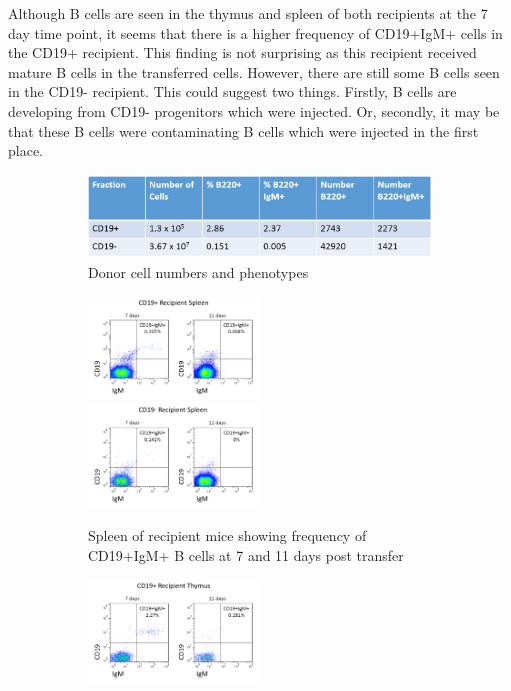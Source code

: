 Although B cells are seen in the thymus and spleen of both recipients at the 7 day time point, it seems that there is a higher frequency of CD19+IgM+ cells in the CD19+ recipient.
This finding is not surprising as this recipient received mature B cells in the transferred cells.
However, there are still some B cells seen in the CD19- recipient.
This could suggest two things.
Firstly, B cells are developing from CD19- progenitors which were injected.
Or, secondly, it may be that these B cells were contaminating B cells which were injected in the first place.

\begin{figure}
	\begin{subfigure}{\textwidth}
	\includegraphics[width=\textwidth]{Figures/WTdonortable.png}
	\caption{Donor cell numbers and phenotypes}
	\end{subfigure}
	\begin{subfigure}{\textwidth}
	\includegraphics[width=0.5\textwidth]{Figures/CD19posrecipspleen.png}
	\includegraphics[width=0.5\textwidth]{Figures/CD19negrecipspleen.png}
	\caption{Spleen of recipient mice showing frequency of CD19+IgM+ B cells at 7 and 11 days post transfer}
	\end{subfigure}
	\begin{subfigure}{\textwidth}
	\includegraphics[width=0.5\textwidth]{Figures/CD19posrecipthy.png}

\end{subfigure}
\end{figure}
